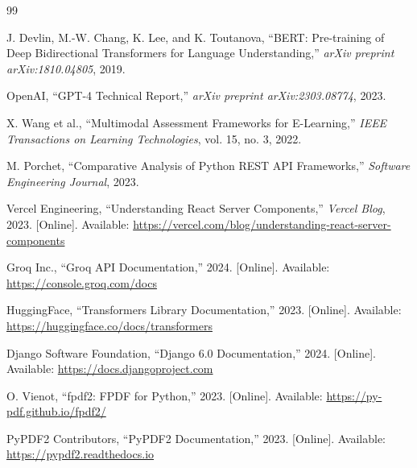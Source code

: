 \documentclass[12pt,a4paper]{report}
\begin{document}
\begin{thebibliography}{99}

J. Devlin, M.-W. Chang, K. Lee, and K. Toutanova, ``BERT: Pre-training of Deep Bidirectional Transformers for Language Understanding,'' \textit{arXiv preprint arXiv:1810.04805}, 2019.

OpenAI, ``GPT-4 Technical Report,'' \textit{arXiv preprint arXiv:2303.08774}, 2023.

X. Wang et al., ``Multimodal Assessment Frameworks for E-Learning,'' \textit{IEEE Transactions on Learning Technologies}, vol. 15, no. 3, 2022.

M. Porchet, ``Comparative Analysis of Python REST API Frameworks,'' \textit{Software Engineering Journal}, 2023.

Vercel Engineering, ``Understanding React Server Components,'' \textit{Vercel Blog}, 2023. [Online]. Available: \url{https://vercel.com/blog/understanding-react-server-components}

Groq Inc., ``Groq API Documentation,'' 2024. [Online]. Available: \url{https://console.groq.com/docs}

HuggingFace, ``Transformers Library Documentation,'' 2023. [Online]. Available: \url{https://huggingface.co/docs/transformers}

Django Software Foundation, ``Django 6.0 Documentation,'' 2024. [Online]. Available: \url{https://docs.djangoproject.com}

O. Vienot, ``fpdf2: FPDF for Python,'' 2023. [Online]. Available: \url{https://py-pdf.github.io/fpdf2/}

PyPDF2 Contributors, ``PyPDF2 Documentation,'' 2023. [Online]. Available: \url{https://pypdf2.readthedocs.io}

\end{thebibliography}
\end{document}
